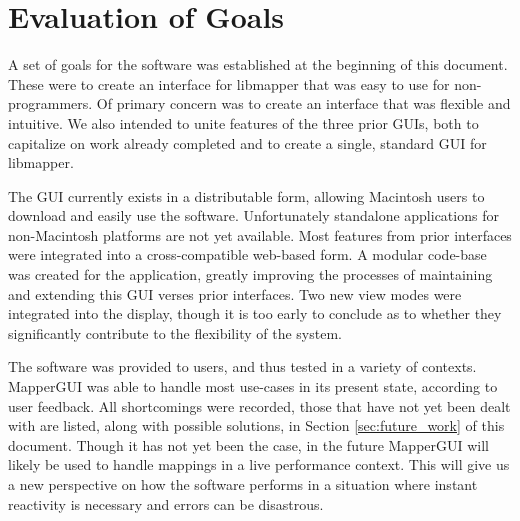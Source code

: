 \section{Evaluation of Goals} %
\label{sec:evaluation_of_goals}

A set of goals for the software was established at the beginning of this document. These were to create an interface for libmapper that was easy to use for non-programmers. Of primary concern was to create an interface that was flexible and intuitive. We also intended to unite features of the three prior GUIs, both to capitalize on work already completed and to create a single, standard GUI for libmapper. 

The GUI currently exists in a distributable form, allowing Macintosh users to download and easily use the software. Unfortunately standalone applications for non-Macintosh platforms are not yet available. Most features from prior interfaces were integrated into a cross-compatible web-based form. A modular code-base was created for the application, greatly improving the processes of maintaining and extending this GUI verses prior interfaces. Two new view modes were integrated into the display, though it is too early to conclude as to whether they significantly contribute to the flexibility of the system.

The software was provided to users, and thus tested in a variety of contexts. MapperGUI was able to handle most use-cases in its present state, according to user feedback. All shortcomings were recorded, those that have not yet been dealt with are listed, along with possible solutions, in Section \ref{sec:future_work} of this document. Though it has not yet been the case, in the future MapperGUI will likely be used to handle mappings in a live performance context. This will give us a new perspective on how the software performs in a situation where instant reactivity is necessary and errors can be disastrous. 
	




